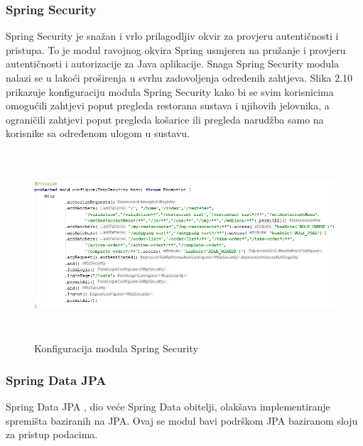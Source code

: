 \documentclass[times, utf8, zavrsni, numeric]{fer}
\begin{document}
\subsubsection{Spring Security}
Spring Security je snažan i vrlo prilagodljiv okvir za provjeru autentičnosti i pristupa. To je modul ravojnog okvira Spring usmjeren na pružanje i provjeru autentičnosti i autorizacije za Java aplikacije. Snaga Spring Security modula nalazi se u lakoći proširenja u svrhu zadovoljenja određenih zahtjeva. Slika 2.10 prikazuje konfiguraciju modula Spring Security kako bi se svim korisnicima omogućili zahtjevi poput pregleda restorana sustava i njihovih jelovnika, a ograničili zahtjevi poput pregleda košarice ili pregleda narudžba samo na korisnike sa određenom ulogom u sustavu. 
\begin{figure}[htb]
\includegraphics[height=7.0cm]{security.png}
\caption{Konfiguracija modula Spring Security}
\label{fig:security}
\end{figure}
\subsubsection{Spring Data JPA}
Spring Data JPA , dio veće Spring Data obitelji, olakšava implementiranje spremišta  baziranih na JPA. Ovaj se modul bavi podrškom JPA baziranom sloju za pristup podacima.
\end{document}
